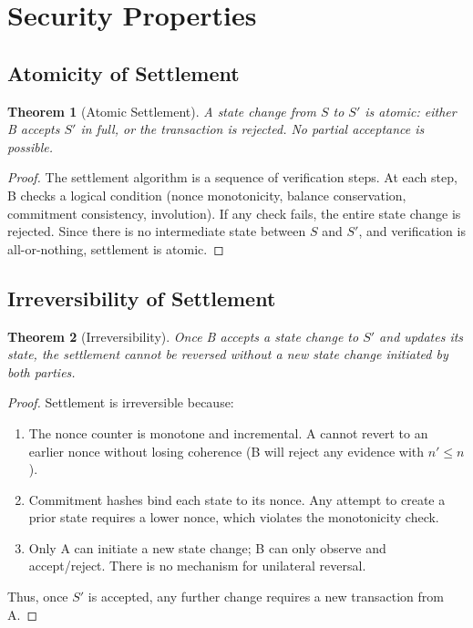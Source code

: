 \documentclass[twocolumn,10pt,a4paper]{article}
\theoremstyle{plain}
\newtheorem{theorem}{Theorem}[section]
\theoremstyle{definition}
\begin{document}
\section{Security Properties}
\label{sec:security}

\subsection{Atomicity of Settlement}

\begin{theorem}[Atomic Settlement]
A state change from $S$ to $S'$ is atomic: either B accepts $S'$ in full, or the transaction is rejected. No partial acceptance is possible.
\end{theorem}

\begin{proof}
The settlement algorithm is a sequence of verification steps. At each step, B checks a logical condition (nonce monotonicity, balance conservation, commitment consistency, involution). If any check fails, the entire state change is rejected. Since there is no intermediate state between $S$ and $S'$, and verification is all-or-nothing, settlement is atomic.
\end{proof}

\subsection{Irreversibility of Settlement}

\begin{theorem}[Irreversibility]
Once B accepts a state change to $S'$ and updates its state, the settlement cannot be reversed without a new state change initiated by both parties.
\end{theorem}

\begin{proof}
Settlement is irreversible because:
\begin{enumerate}
\item The nonce counter is monotone and incremental. A cannot revert to an earlier nonce without losing coherence (B will reject any evidence with $n' \leq n$).
\item Commitment hashes bind each state to its nonce. Any attempt to create a prior state requires a lower nonce, which violates the monotonicity check.
\item Only A can initiate a new state change; B can only observe and accept/reject. There is no mechanism for unilateral reversal.
\end{enumerate}
Thus, once $S'$ is accepted, any further change requires a new transaction from A.
\end{proof}
\end{document}
